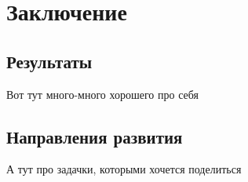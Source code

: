 \section*{Заключение}

\subsection{Результаты}

Вот тут много-много хорошего про себя

\subsection{Направления развития}

А тут про задачки, которыми хочется поделиться
